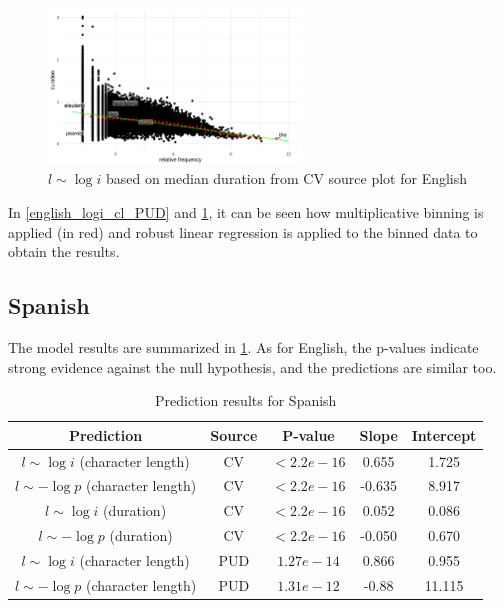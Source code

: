 \begin{figure}[H]
    \centering
    \includegraphics[width=0.6\textwidth]{plots/English_logp_d_CV.pdf}
    \caption{$l \sim \log i$ based on median duration from CV source plot for English}
    \label{english_logp_d_CV}
\end{figure}

In \cref{english_logi_cl_PUD} and \cref{english_logp_d_CV}, it can be seen how multiplicative binning is applied (in red) and robust linear regression is applied to the binned data to obtain the results.

\subsection{Spanish}

The model results are summarized in \cref{tab:spanishresults}. As for English, the p-values indicate strong evidence against the null hypothesis, and the predictions are similar too.

\begin{table}[H]
    \centering
    \begin{tabular}{c|c|c|c|c}
        Prediction & Source & P-value & Slope & Intercept \\ \hline
        $l \sim \log i$ (character length) & CV & $<2.2e-16$ & 0.655 & 1.725 \\
        $l \sim -\log p$ (character length) & CV & $<2.2e-16$ & -0.635 & 8.917 \\
        $l \sim \log i$ (duration) & CV & $<2.2e-16$ & 0.052 & 0.086 \\
        $l \sim -\log p$ (duration) & CV & $<2.2e-16$ & -0.050 & 0.670 \\
        $l \sim \log i$ (character length) & PUD & $1.27e-14$ & 0.866 & 0.955 \\
        $l \sim -\log p$ (character length) & PUD & $1.31e-12$ & -0.88 & 11.115 \\
    \end{tabular}
    \caption{Prediction results for Spanish}
    \label{tab:spanishresults}
\end{table}

